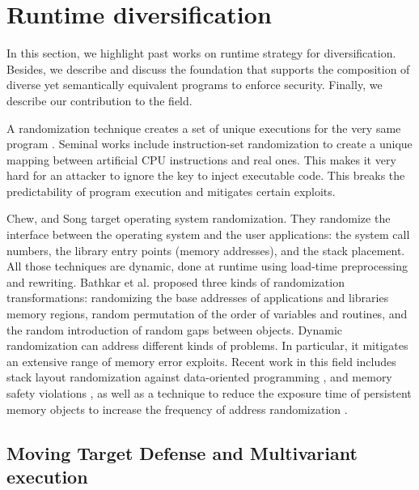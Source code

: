 \section{Runtime diversification}
\label{sota:randomization}

In this section, we highlight past works on runtime strategy for diversification. Besides, we describe and discuss the foundation that supports the composition of diverse yet semantically equivalent programs to enforce security. Finally, we describe our contribution to the field.


A randomization technique creates a set of unique executions for the very same program \cite{bhatkar03}. Seminal works include instruction-set randomization \cite{Kc03,barrantes2003randomized}
to create a unique mapping between artificial CPU instructions and real ones. This makes it very hard for an attacker to ignore the key to inject executable code. This breaks the predictability of program execution and mitigates certain exploits.


Chew, and Song \cite{Chew02mitigatingbuffer} target operating system randomization. They randomize the interface between the operating system and the user applications:
the system call numbers, the library entry points (memory addresses), and the stack placement. All those techniques are dynamic, done at runtime using load-time preprocessing and rewriting. 
Bathkar et al. \cite{bhatkar03,bhatkar2005efficient} proposed three kinds of randomization transformations: randomizing the base addresses of applications and libraries  memory regions, random permutation of the order of variables and routines, and the random introduction of random gaps between objects. 
Dynamic randomization can address different kinds of problems. In particular, it mitigates an extensive range of memory error exploits. 
Recent work in this field includes stack layout randomization against data-oriented programming \cite{aga2019smokestack}, and memory safety violations \cite{lee2021savior}, as well as a technique to reduce the exposure time of persistent memory objects to increase the frequency of address randomization \cite{xu2020merr}.






\subsection*{Moving Target Defense and Multivariant execution}
\label{sota:multivariantex}

